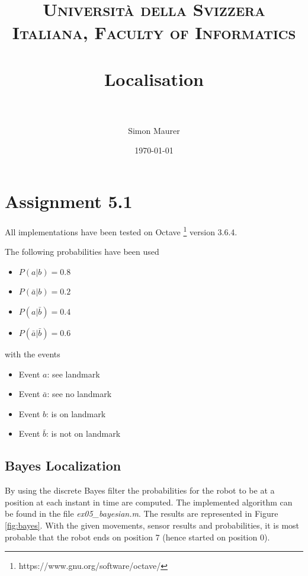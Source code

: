 \documentclass[paper=a4, fontsize=11pt]{scrartcl} %
\title{	
\normalfont \normalsize 
\textsc{Università della Svizzera Italiana, Faculty of Informatics} \\ [25pt] %
\horrule{0.5pt} \\[0.4cm] %
\huge Localisation \\ %
\horrule{2pt} \\[0.5cm] %
}
\author{Simon Maurer} %
\date{\normalsize\today} %
\begin{document}
\maketitle %


\section{Assignment 5.1}
All implementations have been tested on Octave
\footnote{https://www.gnu.org/software/octave/} version 3.6.4.

The following probabilities have been used
\begin{itemize}
    \item $ P(a|b) = 0.8 $
    \item $ P(\bar{a}|b) = 0.2 $
    \item $ P(a|\bar{b}) = 0.4 $
    \item $ P(\bar{a}|\bar{b}) = 0.6 $
\end{itemize}
with the events
\begin{itemize}
    \item Event $ a $: see landmark
    \item Event $ \bar{a} $: see no landmark
    \item Event $ b $: is on landmark
    \item Event $ \bar{b} $: is not on landmark
\end{itemize}

\subsection{Bayes Localization}
By using the discrete Bayes filter the probabilities for the robot to be at
a position at each instant in time are computed. The implemented algorithm can
be found in the file \emph{ex05\_bayesian.m}.  The results are represented in
Figure \ref{fig:bayes}. With the given movements, sensor results and
probabilities, it is most probable that the robot ends on position 7 (hence
started on position 0).
\end{document}
